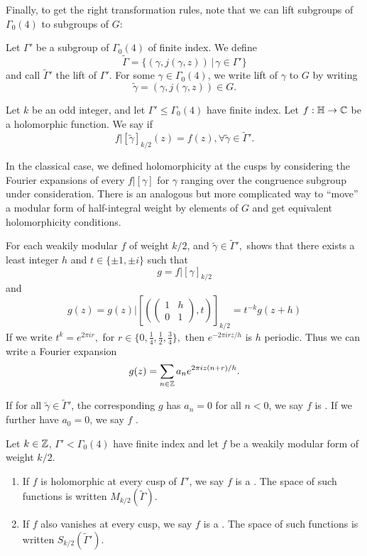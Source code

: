 \documentclass[12pt, a4paper]{report}
\begin{document}
Finally, to get the right transformation rules, note that we can lift subgroups
of $\Gamma_0(4)$ to
subgroups of $G$:

Let $\Gamma'$ be a subgroup of $\Gamma_0(4)$ of finite index. We define
\[\tilde{\Gamma} = \{(\gamma, j(\gamma,z)) \, | \, \gamma \in \Gamma'\}\]
and call $\tilde{\Gamma}'$ the lift of $\Gamma'$. For some $\gamma \in
\Gamma_0(4)$, we write lift of $\gamma$ to $G$ by writing
\[\tilde{\gamma} = (\gamma, j(\gamma,z)) \in G.\]

\begin{defn}
  Let $k$ be an odd integer, and let $\Gamma' \leq \Gamma_0(4)$ have finite index.
  Let $f : \mathbb{H} \rightarrow {\mathbb C}$ be a holomorphic function. We say  if
  \[f | [\tilde{\gamma}]_{k/2} (z) = f(z), \forall \tilde{\gamma} \in
    \tilde{\Gamma}'.\]
\end{defn}

In the classical case, we defined holomorphicity at the cusps by considering
the Fourier expansions of every $f | [\gamma]$ for $\gamma$ ranging over the
congruence subgroup under consideration. There is an analogous but more
complicated way to ``move'' a modular form of half-integral weight by elements
of $G$ and get equivalent holomorphicity conditions.

For each weakily modular $f$ of weight $k/2$, and $\tilde{\gamma} \in \tilde{\Gamma}',$
\cite[page 180-182]{koblitz} shows that there exists a least integer $h$ and 
$t \in \{\pm 1, \pm i\}$ such that 
\[g = f | [\gamma]_{k/2} \]
and 
\[g(z) = g(z) | \left[ \left( \left(
        \begin{smallmatrix}
          1 & h \\ 0 & 1
        \end{smallmatrix}
\right), t \right) \right]_{k/2} = t^{-k}g(z+h) \]
If we write $t^k = e^{2\pi i r}, $ for $r \in \{0, \frac{1}{4}, \frac{1}{2},
\frac{3}{4}\}, $ then $e^{-2 \pi i r z / h}$ is $h$ periodic. Thus we can write
a Fourier expansion
\[g(z) = \sum\limits_{n \in {\mathbb Z}} a_n e^{2 \pi i z(n+r)/h}.\]

If for all $\tilde{\gamma} \in \tilde{\Gamma}'$, the corresponding $g$ has
$a_n = 0$ for all $n < 0$, we say $f$ is . 
If we further have $a_0 = 0$, we say $f$ .

\begin{defn}
  Let $k \in {\mathbb Z}$, $\Gamma' < \Gamma_0(4)$ have finite index and let $f$ be a
  weakily modular form of weight $k/2$.
  \begin{enumerate}
  \item If $f$ is holomorphic at every cusp of $\Gamma'$, we say $f$ is a
    . The space of such functions is written 
    $M_{k/2}(\tilde{\Gamma})$.
  \item If $f$ also vanishes at every cusp, we say $f$ is a . The space of such functions is written $S_{k/2}(\tilde{\Gamma}').$
  \end{enumerate}
\end{defn}
\end{document}
